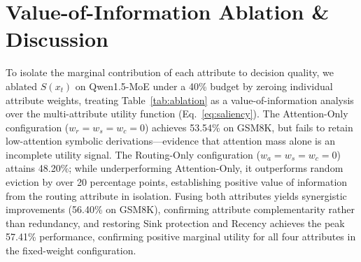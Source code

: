 \documentclass[conference]{IEEEtran}
\begin{document}
\section{Value-of-Information Ablation \& Discussion}

\begin{table}[t]
\centering
\caption{Component ablation on Qwen1.5-MoE-A2.7B at 40\% budget. Values report mean and [95\% bootstrap CI].}
\label{tab:ablation}
\end{table}

To isolate the marginal contribution of each attribute to decision quality, we ablated $S(x_t)$ on Qwen1.5-MoE under a 40\% budget by zeroing individual attribute weights, treating Table~\ref{tab:ablation} as a value-of-information analysis over the multi-attribute utility function (Eq.~\ref{eq:saliency}). The Attention-Only configuration ($w_r=w_s=w_c=0$) achieves 53.54\% on GSM8K, but fails to retain low-attention symbolic derivations---evidence that attention mass alone is an incomplete utility signal. The Routing-Only configuration ($w_a=w_s=w_c=0$) attains 48.20\%; while underperforming Attention-Only, it outperforms random eviction by over 20 percentage points, establishing positive value of information from the routing attribute in isolation. Fusing both attributes yields synergistic improvements (56.40\% on GSM8K), confirming attribute complementarity rather than redundancy, and restoring Sink protection and Recency achieves the peak 57.41\% performance, confirming positive marginal utility for all four attributes in the fixed-weight configuration.
\end{document}
